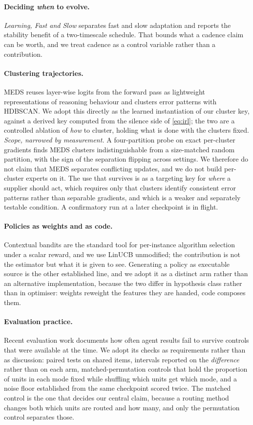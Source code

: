 \paragraph{Deciding \emph{when} to evolve.} \emph{Learning, Fast and Slow} separates fast
and slow adaptation and reports the stability benefit of a two-timescale schedule. That
bounds what a cadence claim can be worth, and we treat cadence as a control variable rather
than a contribution.

\paragraph{Clustering trajectories.} MEDS reuses layer-wise logits from the forward pass as
lightweight representations of reasoning behaviour and clusters error patterns with HDBSCAN.
We adopt this directly as the learned instantiation of our cluster key, against a derived
key computed from the silence side of \eqref{eq:irl}; the two are a controlled ablation of
\emph{how} to cluster, holding what is done with the clusters fixed. \emph{Scope, narrowed by
measurement.} A four-partition probe on exact per-cluster gradients finds MEDS clusters
indistinguishable from a size-matched random partition, with the sign of the separation
flipping across settings. We therefore do not claim that MEDS separates conflicting updates,
and we do not build per-cluster experts on it. The use that survives is as a targeting key for
\emph{where} a supplier should act, which requires only that clusters identify consistent
error patterns rather than separable gradients, and which is a weaker and separately testable
condition. A confirmatory run at a later checkpoint is in flight.

\paragraph{Policies as weights and as code.} Contextual bandits are the standard tool for
per-instance algorithm selection under a scalar reward, and we use LinUCB unmodified; the
contribution is not the estimator but what it is given to see. Generating a policy as
executable source is the other established line, and we adopt it as a distinct arm rather
than an alternative implementation, because the two differ in hypothesis class rather than in
optimiser: weights reweight the features they are handed, code composes them.

\paragraph{Evaluation practice.} Recent evaluation work documents how often agent results
fail to survive controls that were available at the time. We adopt its checks as
requirements rather than as discussion: paired tests on shared items, intervals reported on
the \emph{difference} rather than on each arm, matched-permutation controls that hold the
proportion of units in each mode fixed while shuffling which units get which mode, and a
noise floor established from the same checkpoint scored twice. The matched control is the
one that decides our central claim, because a routing method changes both which units are
routed and how many, and only the permutation control separates those.
